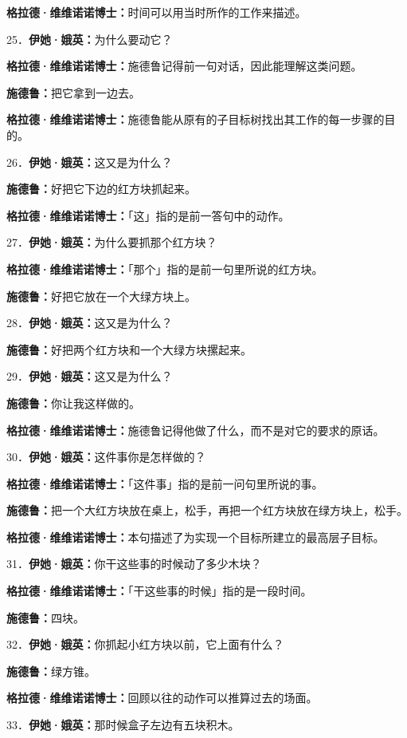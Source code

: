 \documentclass[
  12pt,
  twoside,
  openright,
  oldfontcommands,
]{memoir}
\newcommand{\dialogname}[1]{{\heifamily\bfseries #1}}
\begin{document}
\dialogname{格拉德·维维诺诺博士：}时间可以用当时所作的工作来描述。

25．\dialogname{伊她·娥英：}为什么要动它？

\dialogname{格拉德·维维诺诺博士：}施德鲁记得前一句对话，因此能理解这类问题。

\dialogname{施德鲁：}把它拿到一边去。

\dialogname{格拉德·维维诺诺博士：}施德鲁能从原有的子目标树找出其工作的每一步骤的目的。

26．\dialogname{伊她·娥英：}这又是为什么？

\dialogname{施德鲁：}好把它下边的红方块抓起来。

\dialogname{格拉德·维维诺诺博士：}「这」指的是前一答句中的动作。

27．\dialogname{伊她·娥英：}为什么要抓那个红方块？

\dialogname{格拉德·维维诺诺博士：}「那个」指的是前一句里所说的红方块。

\dialogname{施德鲁：}好把它放在一个大绿方块上。

28．\dialogname{伊她·娥英：}这又是为什么？

\dialogname{施德鲁：}好把两个红方块和一个大绿方块摞起来。

29．\dialogname{伊她·娥英：}这又是为什么？

\dialogname{施德鲁：}你让我这样做的。

\dialogname{格拉德·维维诺诺博士：}施德鲁记得他做了什么，而不是对它的要求的原话。

30．\dialogname{伊她·娥英：}这件事你是怎样做的？

\dialogname{格拉德·维维诺诺博士：}「这件事」指的是前一问句里所说的事。

\dialogname{施德鲁：}把一个大红方块放在桌上，松手，再把一个红方块放在绿方块上，松手。

\dialogname{格拉德·维维诺诺博士：}本句描述了为实现一个目标所建立的最高层子目标。

31．\dialogname{伊她·娥英：}你干这些事的时候动了多少木块？

\dialogname{格拉德·维维诺诺博士：}「干这些事的时候」指的是一段时间。

\dialogname{施德鲁：}四块。

32．\dialogname{伊她·娥英：}你抓起小红方块以前，它上面有什么？

\dialogname{施德鲁：}绿方锥。

\dialogname{格拉德·维维诺诺博士：}回顾以往的动作可以推算过去的场面。

33．\dialogname{伊她·娥英：}那时候盒子左边有五块积木。
\end{document}
